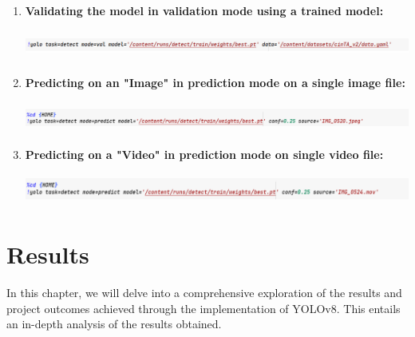\documentclass[12 pt]{report}
\begin{document}
{\begin{enumerate}
    \item \textbf{Validating the model in validation mode using a trained model:}
    \begin{center}
        \includegraphics[width=17cm, height=1cm]{validating the yolomodel on the dataset.png}
    \end{center}

    \item \textbf{Predicting on an "Image" in prediction mode on a single image file:}
    \begin{center}
        \includegraphics[width=17cm, height=1cm]{Testing the model on real-world img.png}
    \end{center}

    \item \textbf{Predicting on a "Video" in prediction mode on single video file:}
    \begin{center}
        \includegraphics[width=17cm, height=1cm]{Testing the model on real-world video.png}
    \end{center}

  \end{enumerate}
}

\newpage
\chapter{Results}
{
In this chapter, we will delve into a comprehensive exploration of the results and project outcomes achieved through the implementation of YOLOv8. This entails an in-depth analysis of the results obtained.
}
\end{document}
